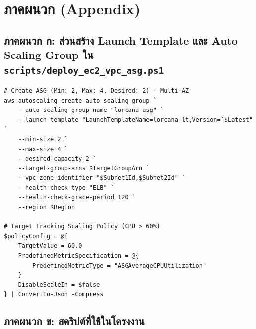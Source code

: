 \chapter*{ภาคผนวก (Appendix)}

\section*{ภาคผนวก ก: ส่วนสร้าง Launch Template และ Auto Scaling Group ใน \texttt{scripts/deploy\_ec2\_vpc\_asg.ps1}}

\begin{lstlisting}[caption={ส่วนสร้าง ASG และ scaling policy (ตัดตอนจากสคริปต์จริง)}]
# Create ASG (Min: 2, Max: 4, Desired: 2) - Multi-AZ
aws autoscaling create-auto-scaling-group `
    --auto-scaling-group-name "lorcana-asg" `
    --launch-template "LaunchTemplateName=lorcana-lt,Version=`$Latest" `
    --min-size 2 `
    --max-size 4 `
    --desired-capacity 2 `
    --target-group-arns $TargetGroupArn `
    --vpc-zone-identifier "$Subnet1Id,$Subnet2Id" `
    --health-check-type "ELB" `
    --health-check-grace-period 120 `
    --region $Region

# Target Tracking Scaling Policy (CPU > 60%)
$policyConfig = @{
    TargetValue = 60.0
    PredefinedMetricSpecification = @{
        PredefinedMetricType = "ASGAverageCPUUtilization"
    }
    DisableScaleIn = $false
} | ConvertTo-Json -Compress
\end{lstlisting}

\section*{ภาคผนวก ข: สคริปต์ที่ใช้ในโครงงาน}

